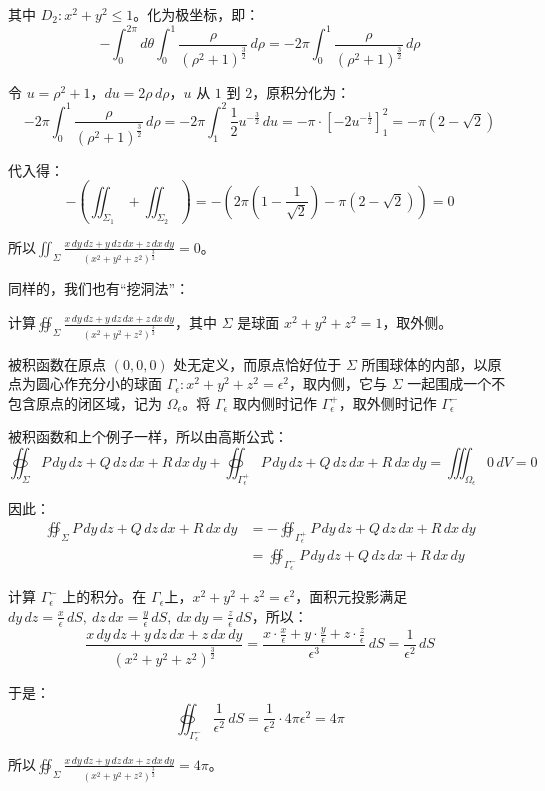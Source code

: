 \begin{myexample}
其中 $D_2: x^2+y^2\le 1$。化为极坐标，即：
\[
- \int_0^{2\pi} d\theta \int_0^1 \frac{\rho}{(\rho^2+1)^{\frac{3}{2}}}\,d\rho
= -2\pi \int_0^1 \frac{\rho}{(\rho^2+1)^{\frac{3}{2}}}\,d\rho
\]

令 $u=\rho^2+1$，$du=2\rho\,d\rho$，$u$ 从 $1$ 到 $2$，原积分化为：
\[-2\pi \int_0^1 \frac{\rho}{(\rho^2+1)^{\frac{3}{2}}}\,d\rho
= -2\pi \int_1^2 \frac{1}{2}u^{-\frac{3}{2}}\,du
= -\pi \cdot \left[ -2u^{-\frac{1}{2}} \right]_1^2
= -\pi (2 - \sqrt{2})
\]

代入得：
\[
-(\iint_{\Sigma_1} + \iint_{\Sigma_2})=-(2\pi ( 1 - \frac{1}{\sqrt{2}} )-\pi (2 - \sqrt{2}))=0\]

所以\(\iint_{\Sigma} \frac{x\,dy\,dz + y\,dz\,dx + z\,dx\,dy}{(x^2+y^2+z^2)^{\frac32}}=0\)。
\end{myexample}

同样的，我们也有“挖洞法”：

\begin{myexample}
    计算\(\oiint_{\Sigma} \frac{x\,dy\,dz + y\,dz\,dx + z\,dx\,dy}{(x^2+y^2+z^2)^{\frac32}}\)，其中 $\Sigma$ 是球面 $x^2+y^2+z^2=1$，取外侧。

    被积函数在原点 $(0,0,0)$ 处无定义，而原点恰好位于 $\Sigma$ 所围球体的内部，以原点为圆心作充分小的球面 $\Gamma_\epsilon: x^2+y^2+z^2=\epsilon^2$，取内侧，它与 $\Sigma$ 一起围成一个不包含原点的闭区域，记为 $\Omega_\epsilon$。将 $\Gamma_\epsilon$ 取内侧时记作 $\Gamma_\epsilon^+$，取外侧时记作 $\Gamma_\epsilon^-$

    被积函数和上个例子一样，所以由高斯公式：
    \[
    \oiint_{\Sigma} P\,dy\,dz + Q\,dz\,dx + R\,dx\,dy
    + \oiint_{\Gamma_\epsilon^+} P\,dy\,dz + Q\,dz\,dx + R\,dx\,dy
    = \iiint_{\Omega_\epsilon} 0\,dV = 0
    \]

    因此：
    \[
\begin{aligned}
        \oiint_{\Sigma} P\,dy\,dz + Q\,dz\,dx + R\,dx\,dy
        &= - \oiint_{\Gamma_\epsilon^+} P\,dy\,dz + Q\,dz\,dx + R\,dx\,dy\\
        &= \oiint_{\Gamma_\epsilon^-} P\,dy\,dz + Q\,dz\,dx + R\,dx\,dy
\end{aligned}
    \]

    计算 $\Gamma_\epsilon^-$ 上的积分。在 $\Gamma_\epsilon$上，$x^2+y^2+z^2=\epsilon^2$，面积元投影满足
    $dy\,dz = \frac{x}{\epsilon}\,dS,\ dz\,dx = \frac{y}{\epsilon}\,dS,\ dx\,dy = \frac{z}{\epsilon}\,dS$，所以：
    \[
    \frac{x\,dy\,dz + y\,dz\,dx + z\,dx\,dy}{(x^2+y^2+z^2)^{\frac32}}
    = \frac{x\cdot\frac{x}{\epsilon} + y\cdot\frac{y}{\epsilon} + z\cdot\frac{z}{\epsilon}}{\epsilon^3}\,dS
    = \frac{1}{\epsilon^2}\,dS
    \]

    于是：
    \[
    \oiint_{\Gamma_\epsilon^-} \frac{1}{\epsilon^2}\,dS
    = \frac{1}{\epsilon^2}\cdot 4\pi\epsilon^2 = 4\pi
    \]

    所以\(\oiint_{\Sigma} \frac{x\,dy\,dz + y\,dz\,dx + z\,dx\,dy}{(x^2+y^2+z^2)^{\frac32}} = 4\pi\)。
\end{myexample}

